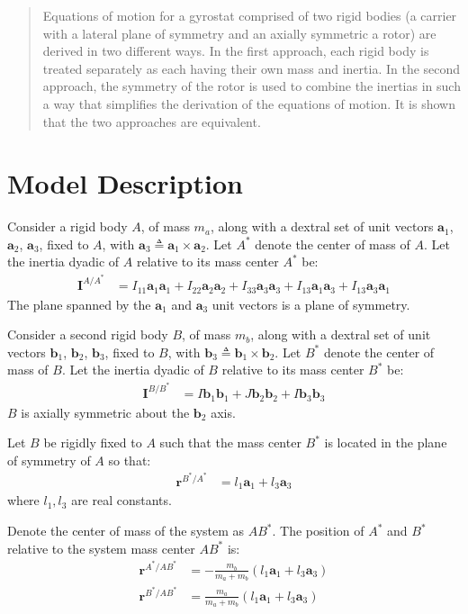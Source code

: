 \documentclass[letterpaper,11pt]{article}
\newcommand{\bs}[1]{ \boldsymbol{ #1 } }
\begin{document}
\begin{abstract}

  Equations of motion for a gyrostat comprised of two rigid bodies (a carrier
  with a lateral plane of symmetry and an axially symmetric a rotor) are
  derived in two different ways.  In the first approach, each rigid body is
  treated separately as each having their own mass and inertia.  In the second
  approach, the symmetry of the rotor is used to combine the inertias in such a
  way that simplifies the derivation of the equations of motion.  It is shown
  that the two approaches are equivalent.

\end{abstract}

\section*{Model Description}
Consider a rigid body $A$, of mass $m_a$, along with a dextral set of unit
vectors $\bs{a}_1$, $\bs{a}_2$, $\bs{a}_3$, fixed to $A$, with $\bs{a}_3
\triangleq \bs{a}_1 \times \bs{a}_2$.  Let $A^*$ denote the center of mass of
$A$.  Let the inertia dyadic of $A$ relative to its mass center $A^*$ be:
\begin{align*}
  \bs{I}^{A/A^*} & = I_{11}\bs{a}_1\bs{a}_1 + I_{22}\bs{a}_2\bs{a}_2 +
  I_{33}\bs{a}_3\bs{a}_3 + I_{13}\bs{a}_1\bs{a}_3 + I_{13}\bs{a}_3\bs{a}_1
\end{align*}
The plane spanned by the $\bs{a}_1$ and $\bs{a}_3$ unit vectors is a plane of
symmetry.

Consider a second rigid body $B$, of mass $m_b$, along with a dextral set of
unit vectors $\bs{b}_1$, $\bs{b}_2$, $\bs{b}_3$, fixed to $B$, with $\bs{b}_3
\triangleq \bs{b}_1 \times \bs{b}_2$.  Let $B^*$ denote the center of mass of
$B$.  Let the inertia dyadic of $B$ relative to its mass center  $B^*$ be:
\begin{align*}
  \bs{I}^{B/B^*} & = I\bs{b}_1\bs{b}_1 + J\bs{b}_2\bs{b}_2 + I\bs{b}_3\bs{b}_3
\end{align*}
$B$ is axially symmetric about the $\bs{b}_2$ axis.

Let $B$ be rigidly fixed to $A$ such that the mass center $B^*$ is located in
the plane of symmetry of $A$ so that:
\begin{align*}
  \bs{r}^{B^* / A^*} & = l_1 \bs{a}_1 + l_3 \bs{a}_3
\end{align*}
where $l_1, l_3$ are real constants.

Denote the center of mass of the system as $AB^*$. The position of $A^*$ and
$B^*$ relative to the system mass center $AB^*$ is:
\begin{align*}
  \bs{r}^{A^* / AB^*} & = -\frac{m_b}{m_a+m_b}(l_1 \bs{a}_1 + l_3 \bs{a}_3) \\
  \bs{r}^{B^* / AB^*} & =  \frac{m_a}{m_a+m_b}(l_1 \bs{a}_1 + l_3 \bs{a}_3)
\end{align*}
\end{document}
